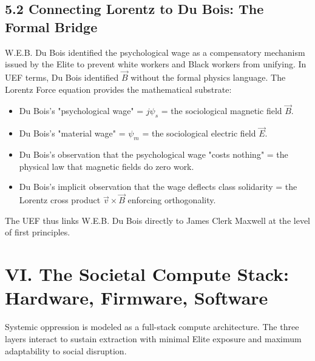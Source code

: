 \documentclass[12pt]{book}
\numberwithin{equation}{chapter}
\begin{document}
\subsection{5.2 Connecting Lorentz to Du Bois: The Formal Bridge}

    W.E.B. Du Bois identified the psychological wage as a compensatory mechanism issued by the Elite to prevent white workers and Black workers from unifying. In UEF terms, Du Bois identified $\vec{B}$ without the formal physics language. The Lorentz Force equation provides the mathematical substrate:
  

\begin{itemize}

\item Du Bois's "psychological wage" = $j\psi_s$ = the sociological magnetic field $\vec{B}$.

\item Du Bois's "material wage" = $\psi_m$ = the sociological electric field $\vec{E}$.

\item Du Bois's observation that the psychological wage "costs nothing" = the physical law that magnetic fields do zero work.

\item Du Bois's implicit observation that the wage deflects class solidarity = the Lorentz cross product $\vec{v} \times \vec{B}$ enforcing orthogonality.

\end{itemize}

    The UEF thus links W.E.B. Du Bois directly to James Clerk Maxwell at the level of first principles.
  

\section{VI. The Societal Compute Stack: Hardware, Firmware, Software}

    Systemic oppression is modeled as a full-stack compute architecture. The three layers interact to sustain extraction with minimal Elite exposure and maximum adaptability to social disruption.
  
\end{document}
